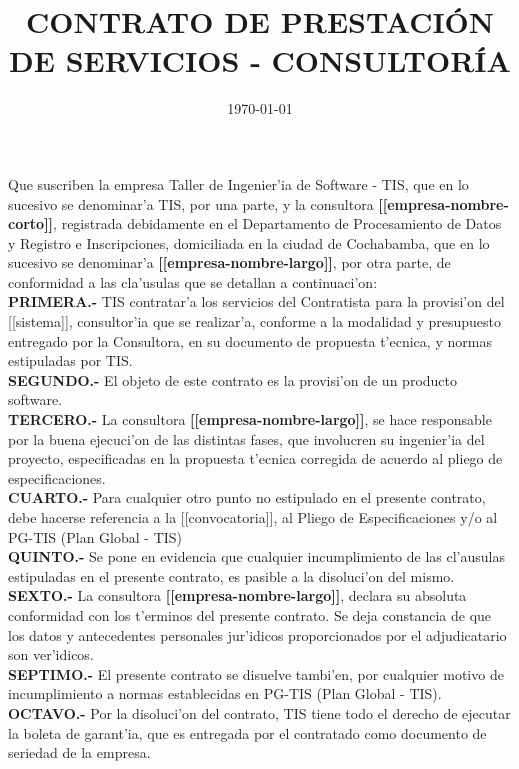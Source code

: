 \documentclass{article}
\newcommand{\sistema}[0]{[[sistema]]}
\newcommand{\convocatoria}[0]{[[convocatoria]]}
\newcommand{\empresa}[0]{\textbf{[[empresa-nombre-largo]]}}
\newcommand{\empresaL}[0]{\textbf{[[empresa-nombre-corto]]}}
\begin{document}
\title{\bf{CONTRATO DE PRESTACI\'ON DE SERVICIOS - CONSULTOR\'IA}}
\date \today

\maketitle

Que suscriben la empresa Taller de Ingenier'ia de Software - TIS, que en lo sucesivo se denominar'a TIS, por una parte, y la consultora  \empresaL, registrada debidamente en el Departamento de Procesamiento de Datos y Registro e Inscripciones, domiciliada en la ciudad de Cochabamba, que en lo sucesivo se denominar'a \empresa, por otra parte, de conformidad a las cla'usulas que se detallan a continuaci'on:
\\
{\bf{PRIMERA.-}} TIS contratar'a los servicios del Contratista para la provisi'on del \sistema, consultor'ia que se realizar'a, conforme a la modalidad y  presupuesto entregado por la Consultora, en su documento de propuesta t'ecnica, y normas estipuladas por TIS.
\\
{\bf{SEGUNDO.-}} El objeto de este contrato  es la provisi'on de un producto software.
\\
{\bf{TERCERO.-}} La consultora \empresa,  se hace responsable por la buena ejecuci'on de las distintas fases, que involucren su ingenier'ia del proyecto, especificadas en la propuesta t'ecnica corregida de acuerdo al pliego de especificaciones.
\\
{\bf{CUARTO.-}} Para cualquier otro punto no estipulado en el presente contrato, debe hacerse referencia a la \convocatoria, al Pliego de Especificaciones y/o al PG-TIS (Plan Global - TIS)
\\
{\bf{QUINTO.-}} Se pone en evidencia que cualquier incumplimiento de las cl'ausulas estipuladas en el presente contrato, es pasible a la disoluci'on del mismo.
\\
{\bf{SEXTO.-}} La consultora \empresa,  declara su absoluta conformidad con los t'erminos del presente contrato. Se deja constancia de que los datos y antecedentes personales jur'idicos proporcionados por el adjudicatario son ver'idicos.
\\
{\bf{SEPTIMO.-}} El presente contrato se disuelve tambi'en, por cualquier motivo de incumplimiento a normas establecidas en PG-TIS (Plan Global - TIS).
\\
{\bf{OCTAVO.-}} Por la disoluci'on del contrato, TIS tiene todo el derecho de ejecutar la boleta de garant'ia, que es entregada por el contratado como documento de seriedad de la empresa.
\end{document}
